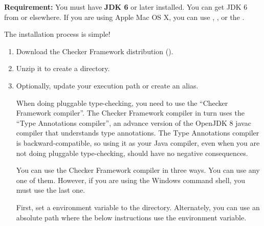 \textbf{Requirement:}
You must have \textbf{JDK 6} or later installed.  You can get JDK 6 from
or elsewhere.  If you are using Apple Mac OS X, you can use
,
,
or the .

The installation process is simple!
\begin{enumerate}
\item
  Download the Checker Framework distribution
  ().
\item 
  Unzip it to create a  directory.


\item
  Optionally, update your execution path or create an alias.

  When doing pluggable type-checking, you need to use the ``Checker
  Framework compiler''.  The Checker Framework compiler in turn uses the
  ``Type Annotations compiler'', an advance version of the OpenJDK 8 javac
  compiler that understands type annotations.  The Type Annotations
  compiler is backward-compatible, so using it as your Java compiler, even
  when you are not doing pluggable type-checking, should have no negative
  consequences.

  You can use the Checker Framework compiler in three ways.  You can use any one of them.  However, if
  you are using the Windows command shell, you must use the last one.

  First, set a  environment variable to the
   directory.  Alternately, you can
  use an absolute path where the below instructions use the 
  environment variable.


\end{enumerate}
